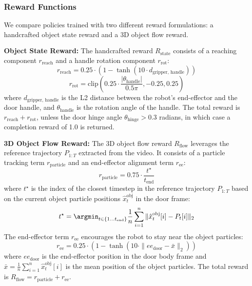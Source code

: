 \subsubsection{Reward Functions}
We compare policies trained with two different reward formulations: a handcrafted object state reward and a 3D object flow reward.

\textbf{Object State Reward:} The handcrafted reward $R_{\text{state}}$ consists of a reaching component $r_{\text{reach}}$ and a handle rotation component $r_{\text{rot}}$:
\begin{equation}
    r_{\text{reach}} = 0.25 \cdot (1 - \tanh(10 \cdot d_{\text{gripper, handle}}))
\end{equation}
\begin{equation}
    r_{\text{rot}} = \text{clip}\left(0.25 \cdot \frac{|\theta_{\text{handle}}|}{0.5\pi}, -0.25, 0.25\right)
\end{equation}
where $d_{\text{gripper, handle}}$ is the L2 distance between the robot's end-effector and the door handle, and $\theta_{\text{handle}}$ is the rotation angle of the handle. The total reward is $r_{\text{reach}} + r_{\text{rot}}$, unless the door hinge angle $\theta_{\text{hinge}} > 0.3$ radians, in which case a completion reward of 1.0 is returned.

\textbf{3D Object Flow Reward:} The 3D object flow reward $R_{\text{flow}}$ leverages the reference trajectory $P_{1:T}$ extracted from the video. It consists of a particle tracking term $r_{\text{particle}}$ and an end-effector alignment term $r_{\text{ee}}$:
\begin{equation}
    r_{\text{particle}} = 0.75 \cdot \frac{t^\star}{t_{\text{end}}}
\end{equation}
where $t^\star$ is the index of the closest timestep in the reference trajectory $P_{1:T}$ based on the current object particle positions $\hat{x}_t^{\text{obj}}$ in the door frame:
\begin{equation}
    t^\star = \argmin_{t \in \{1 \dots t_{\text{end}}\}} \frac{1}{n} \sum_{i=1}^n \|\hat{x}_t^{\text{obj}}[i] - P_t[i]\|_2
\end{equation}
The end-effector term $r_{\text{ee}}$ encourages the robot to stay near the object particles:
\begin{equation}
    r_{\text{ee}} = 0.25 \cdot (1 - \tanh(10 \cdot \|ee_{\text{door}} - \bar{x}\|_2))
\end{equation}
where $ee_{\text{door}}$ is the end-effector position in the door body frame and $\bar{x} = \frac{1}{n}\sum_{i=1}^n \hat{x}_t^{\text{obj}}[i]$ is the mean position of the object particles. The total reward is $R_{\text{flow}} = r_{\text{particle}} + r_{\text{ee}}$.


